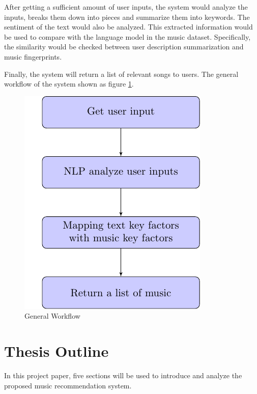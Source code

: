After getting a sufficient amount of user inputs, the system would analyze the inputs, breaks them down into pieces and summarize them into keywords. The sentiment of the text would also be analyzed. This extracted information would be used to compare with the language model in the music dataset. Specifically, the similarity would be checked between user description summarization and music fingerprints.

Finally, the system will return a list of relevant songs to users. The general workflow of the system shown as figure \ref{workflowg}.

\begin{figure}[htbp]
\centering
\includegraphics[width=4 in]{images/workflowg}
\caption{General Workflow}
\label{workflowg}
\end{figure}

\section{Thesis Outline}
\label{sec:outline}

In this project paper, five sections will be used to introduce and analyze the proposed music recommendation system.

